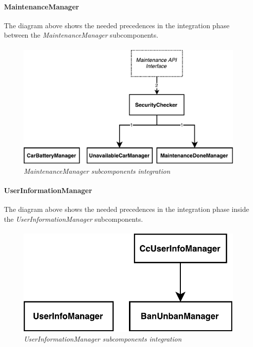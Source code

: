 \paragraph{MaintenanceManager} 
The diagram above shows the needed precedences in the integration phase between the \emph{MaintenanceManager} subcomponents.
\paragraph{}

		\begin{figure}[h]
			\centering
			\includegraphics[width=0.6\linewidth]{img/maintenanceIntegration}
			\caption{
				\label{fig:maintenanceIntegration} 
				\emph{MaintenanceManager subcomponents integration}
			}
		\end{figure}
		
\paragraph{UserInformationManager} 
The diagram above shows the needed precedences in the integration phase inside the \emph{UserInformationManager} subcomponents.
\paragraph{}

		\begin{figure}[h]
			\centering
			\includegraphics[width=0.4\linewidth]{img/userIntegration}
			\caption{
				\label{fig:userIntegration} 
				\emph{UserInformationManager subcomponents integration}
			}
		\end{figure}

\clearpage 

